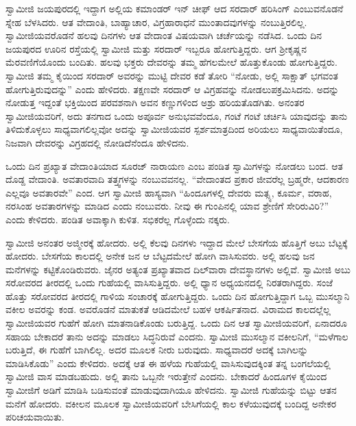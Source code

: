 \newpage

 ಸ್ವಾಮೀಜಿ ಜಯಪುರದಲ್ಲಿ ಇದ್ದಾಗ ಅಲ್ಲಿಯ ಕಮಾಂಡರ್ ಇನ್ ‍ಚೀಫ್ ಆದ ಸರದಾರ್ ಹರಿಸಿಂಗ್ ಎಂಬುವನೊಡನೆ ಸ್ನೇಹ ಬೆಳಸಿದರು. ಆತ ವೇದಾಂತಿ, ಬಾಹ್ಯಾಚಾರ, ವಿಗ್ರಹಾರಾಧನೆ ಮುಂತಾದವುಗಳನ್ನು ನಂಬುತ್ತಿರಲಿಲ್ಲ. ಸ್ವಾಮೀಜಿಯವರೊಡನೆ ಹಲವು ದಿನಗಳು ಆತ ವೇದಾಂತ ವಿಷಯವಾಗಿ ಚರ್ಚೆಯನ್ನು ನಡೆಸಿದ. ಒಂದು ದಿನ ಜಯಪುರದ ಊರಿನ ರಸ್ತೆಯಲ್ಲಿ ಸ್ವಾಮೀಜಿ ಮತ್ತು ಸರದಾರ್ ಇಬ್ಬರೂ ಹೋಗುತ್ತಿದ್ದರು. ಆಗ ಶ‍್ರೀಕೃಷ್ಣನ ಮೆರವಣಿಗೆಯೊಂದು ಬಂದಿತು. ಹಲವು ಭಕ್ತರು ದೇವರನ್ನು ತಮ್ಮ ಹೆಗಲಮೇಲೆ ಹೊತ್ತುಕೊಂಡು ಹೋಗುತ್ತಿದ್ದರು. ಸ್ವಾಮೀಜಿ ತಮ್ಮ ಕೈಯಿಂದ ಸರದಾರ್ ಅವರನ್ನು ಮುಟ್ಟಿ ದೇವರ ಕಡೆ ತೋರಿ “ನೋಡು, ಅಲ್ಲಿ ಸಾಕ್ಷಾತ್ ಭಗವಂತ ಹೋಗುತ್ತಿರುವುದನ್ನು” ಎಂದು ಹೇಳಿದರು. ತಕ್ಷಣವೇ ಸರದಾರ್ ಆ ವಿಗ್ರಹವನ್ನು ನೋಡಲುಪಕ್ರಮಿಸಿದನು. ಅದನ್ನು ನೋಡುತ್ತ ಇದ್ದಂತೆ ಭಕ್ತಿಯಿಂದ ಪರವಶನಾಗಿ ಅವನ ಕಣ್ಣುಗಳಿಂದ ಅಶ್ರು ಹರಿಯತೊಡಗಿತು. ಅನಂತರ ಸ್ವಾಮೀಜಿಯವರಿಗೆ, ಅದು ತನಗಾದ ಒಂದು ಅಪೂರ್ವ ಅನುಭವವೆಂದೂ, ಗಂಟೆ ಗಂಟೆ ಚರ್ಚಿಸಿ ಯಾವುದನ್ನು ತಾನು ತಿಳಿದುಕೊಳ್ಳಲು ಸಾಧ್ಯವಾಗಲಿಲ್ಲವೋ ಅದನ್ನು ಸ್ವಾಮೀಜಿಯವರ ಸ್ಪರ್ಶಮಾತ್ರದಿಂದ ಅರಿಯಲು ಸಾಧ್ಯವಾಯಿತೆಂದೂ, ನಿಜವಾಗಿ ದೇವರನ್ನು ವಿಗ್ರಹದಲ್ಲಿ ನೋಡಿದೆನೆಂದೂ ಹೇಳಿದನು. 

 ಒಂದು ದಿನ ಪ್ರಖ್ಯಾತ ವೇದಾಂತಿಯಾದ ಸೂರಜ್ ನಾರಾಯಣ ಎಂಬ ಪಂಡಿತ ಸ್ವಾಮಿಗಳನ್ನು ನೋಡಲು ಬಂದ. ಆತ ದೊಡ್ದ ವೇದಾಂತಿ. ಅವತಾರವಾದಿ ತತ್ತ್ವಗಳನ್ನು ನಂಬುವವನಲ್ಲ. “ವೇದಾಂತದ ಪ್ರಕಾರ ಜೀವರೆಲ್ಲ ಬ್ರಹ್ಮರೇ, ಆದಕಾರಣ ಎಲ್ಲವೂ ಅವತಾರವೇ” ಎಂದ. ಆಗ ಸ್ವಾಮೀಜಿ ಹಾಸ್ಯವಾಗಿ “ಹಿಂದೂಗಳಲ್ಲಿ ದೇವರು ಮತ್ಸ್ಯ, ಕೂರ್ಮ, ವರಾಹ, ನರಸಿಂಹ ಅವತಾರಗಳನ್ನು ಮಾಡಿದ ಎಂದು ನಂಬುವರು. ನೀವು ಈ ಗುಂಪಿನಲ್ಲಿ ಯಾವ ಶ್ರೇಣಿಗೆ ಸೇರಿರುವಿರಿ?” ಎಂದು ಕೇಳಿದರು. ಪಂಡಿತ ಅವಾಕ್ಕಾಗಿ ಕುಳಿತ. ಸಭಿಕರೆಲ್ಲ ಗೊಳ್ಳೆಂದು ನಕ್ಕರು. 

 ಸ್ವಾಮೀಜಿ ಅನಂತರ ಅಜ್ಮೀರಕ್ಕೆ ಹೋದರು. ಅಲ್ಲಿ ಕೆಲವು ದಿನಗಳು ಇದ್ದಾದ ಮೇಲೆ ಬೇಸಗೆಯ ಹೊತ್ತಿಗೆ ಅಬು ಬೆಟ್ಟಕ್ಕೆ ಹೋದರು. ಬೇಸಗೆಯ ಕಾಲದಲ್ಲಿ ಅನೇಕ ಜನ ಆ ಬೆಟ್ಟದಮೇಲೆ ಹೋಗಿ ವಾಸಿಸುವರು. ಅಲ್ಲಿ ಹಲವು ಜನ ಮನೆಗಳನ್ನು ಕಟ್ಟಿಕೊಂಡಿರುವರು. ಜೈನರ ಅತ್ಯಂತ ಪ್ರಖ್ಯಾತವಾದ ದಿಲ್‍ವಾರಾ ದೇವಸ್ಥಾನಗಳು ಅಲ್ಲಿವೆ. ಸ್ವಾಮೀಜಿ ಅಬು ಸರೋವರದ ತೀರದಲ್ಲಿ ಒಂದು ಗುಹೆಯಲ್ಲಿ ವಾಸಿಸುತ್ತಿದ್ದರು. ಅಲ್ಲಿ ಧ್ಯಾನ ಅಧ್ಯಯನದಲ್ಲಿ ನಿರತರಾಗಿದ್ದರು. ಸಂಜೆ ಹೊತ್ತು ಸರೋವರದ ತೀರದಲ್ಲಿ ಗಾಳಿಯ ಸಂಚಾರಕ್ಕೆ ಹೋಗುತ್ತಿದ್ದರು. ಒಂದು ದಿನ ಹೋಗುತ್ತಿದ್ದಾಗ ಒಬ್ಬ ಮುಸಲ್ಮಾನಿ ವಕೀಲ ಅವರನ್ನು ಕಂಡ. ಅವರೊಡನೆ ಮಾತುಕತೆ ಆಡಿದಮೇಲೆ ಬಹಳ ಆಕರ್ಷಿತನಾದ. ವಿರಾಮದ ಕಾಲದಲ್ಲೆಲ್ಲ ಸ್ವಾಮೀಜಿಯವರ ಗುಹೆಗೆ ಹೋಗಿ ಮಾತನಾಡಿಕೊಂಡು ಬರುತ್ತಿದ್ದ. ಒಂದು ದಿನ ಆತ ಸ್ವಾಮೀಜಿಯವರಿಗೆ, ಏನಾದರೂ ಸಹಾಯ ಬೇಕಾದರೆ ತಾನು ಅದನ್ನು ಮಾಡಲು ಸಿದ್ಧನಿರುವೆ ಎಂದನು. ಸ್ವಾಮೀಜಿ ಮುಸಲ್ಮಾನ ವಕೀಲನಿಗೆ, “ಮಳೆಗಾಲ ಬರುತ್ತಿದೆ, ಈ ಗುಹೆಗೆ ಬಾಗಿಲಿಲ್ಲ. ಅದರ ಮೂಲಕ ನೀರು ಬರುವುದು. ಸಾಧ್ಯವಾದರೆ ಅದಕ್ಕೆ ಬಾಗಿಲನ್ನು ಮಾಡಿಸಿಕೊಡು” ಎಂದು ಕೇಳಿದರು. ಅದಕ್ಕೆ ಆತ ಈ ಹಳೆಯ ಗುಹೆಯಲ್ಲಿ ವಾಸಿಸುವುದಕ್ಕಿಂತ ತನ್ನ ಬಂಗಲೆಯಲ್ಲಿ ಸ್ವಾಮೀಜಿ ವಾಸ ಮಾಡಬಹುದು. ಅಲ್ಲಿ ತಾನು ಒಬ್ಬನೇ ಇರುತ್ತೇನೆ ಎಂದನು. ಬೇಕಾದರೆ ಹಿಂದೂಗಳ ಕೈಯಿಂದ ಸ್ವಾಮೀಜಿಗೆ ಅಡಿಗೆ ಮಾಡಿಸಿ ಬಡಿಸುವಂತೆ ಮಾಡುವುದಾಗಿಯೂ ಹೇಳಿದನು. ಸ್ವಾಮೀಜಿ ಗುಹೆಯನ್ನು ಬಿಟ್ಟು ಆತನ ಮನೆಗೆ ಹೋದರು. ವಕೀಲನ ಮೂಲಕ ಸ್ವಾಮೀಜಿಯವರಿಗೆ ಬೇಸಿಗೆಯಲ್ಲಿ ಕಾಲ ಕಳೆಯುವುದಕ್ಕೆ ಬಂದಿದ್ದ ಅನೇಕರ ಪರಿಚಯವಾಯಿತು. 

